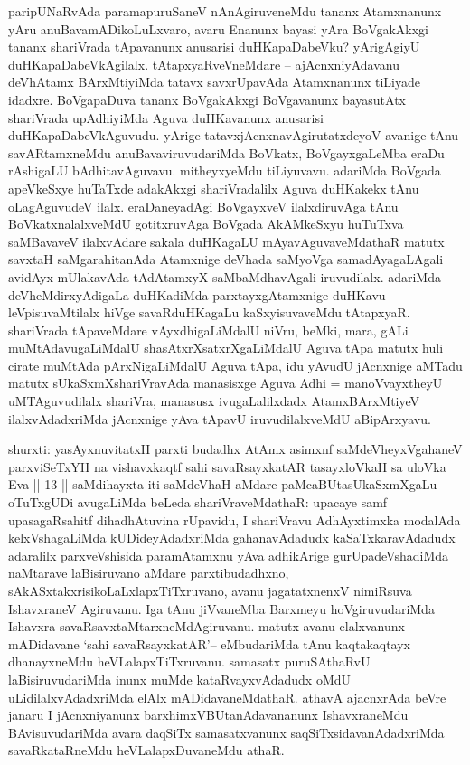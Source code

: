 \begin{artha} %
paripUNaRvAda paramapuruSaneV nAnAgiruveneMdu tananx Atamxnanunx yAru anuBavamADikoLuLxvaro, avaru Enanunx bayasi yAra BoVgakAkxgi tananx shariVrada tApavanunx anusarisi duHKapaDabeVku? yArigAgiyU duHKapaDabeVkAgilalx. tAtapxyaRveVneMdare {\rm --} ajAcnxniyAdavanu deVhAtamx BArxMtiyiMda tatavx savxrUpavAda Atamxnanunx tiLiyade idadxre. BoVgapaDuva tananx BoVgakAkxgi BoVgavanunx bayasutAtx shariVrada upAdhiyiMda Aguva duHKavanunx anusarisi duHKapaDabeVkAguvudu. yArige tatavxjAcnxnavAgirutatxdeyoV avanige tAnu savARtamxneMdu anuBavaviruvudariMda BoVkatx, BoVgayxgaLeMba eraDu rAshigaLU bAdhitavAguvavu. mitheyxyeMdu tiLiyuvavu. adariMda BoVgada apeVkeSxye huTaTxde adakAkxgi shariVradalilx Aguva duHKakekx tAnu oLagAguvudeV ilalx. eraDaneyadAgi BoVgayxveV ilalxdiruvAga tAnu BoVkatxnalalxveMdU gotitxruvAga BoVgada AkAMkeSxyu huTuTxva saMBavaveV ilalxvAdare sakala duHKagaLU mAyavAguvaveMdathaR matutx savxtaH saMgarahitanAda Atamxnige deVhada saMyoVga samadAyagaLAgali avidAyx mUlakavAda tAdAtamxyX saMbaMdhavAgali iruvudilalx. adariMda deVheMdirxyAdigaLa duHKadiMda parxtayxgAtamxnige duHKavu leVpisuvaMtilalx hiVge savaRduHKagaLu kaSxyisuvaveMdu tAtapxyaR. shariVrada tApaveMdare vAyxdhigaLiMdalU niVru, beMki, mara, gALi muMtAdavugaLiMdalU shasAtxrXsatxrXgaLiMdalU Aguva tApa matutx huli cirate muMtAda pArxNigaLiMdalU Aguva tApa, idu yAvudU jAcnxnige aMTadu matutx sUkaSxmXshariVravAda manasisxge Aguva Adhi = manoVvayxtheyU uMTAguvudilalx shariVra, manasusx ivugaLalilxdadx AtamxBArxMtiyeV ilalxvAdadxriMda jAcnxnige yAva tApavU iruvudilalxveMdU aBipArxyavu. 
\end{artha}


\vishaya{}

\begin{artha}
shurxti: yasAyxnuvitatxH parxti budadhx AtAmx asimxnf saMdeVheyxVgahaneV parxviSeTxYH na vishavxkaqtf sahi savaRsayxkatAR tasayxloVkaH sa uloVka Eva || 13 || saMdihayxta iti saMdeVhaH aMdare paMcaBUtasUkaSxmXgaLu oTuTxgUDi avugaLiMda beLeda shariVraveMdathaR: upacaye samf upasagaRsahitf dihadhAtuvina rUpavidu, I shariVravu AdhAyxtimxka modalAda kelxVshagaLiMda kUDideyAdadxriMda gahanavAdadudx kaSaTxkaravAdadudx adaralilx parxveVshisida paramAtamxnu yAva adhikArige gurUpadeVshadiMda naMtarave laBisiruvano aMdare parxtibudadhxno, sAkASxtakxrisikoLaLxlapxTiTxruvano, avanu  jagatatxnenxV nimiRsuva IshavxraneV Agiruvanu. Iga tAnu jiVvaneMba Barxmeyu hoVgiruvudariMda Ishavxra savaRsavxtaMtarxneMdAgiruvanu. matutx avanu elalxvanunx mADidavane `sahi savaRsayxkatAR'{\rm --} eMbudariMda tAnu kaqtakaqtayx dhanayxneMdu heVLalapxTiTxruvanu. samasatx puruSAthaRvU laBisiruvudariMda inunx muMde kataRvayxvAdadudx oMdU uLidilalxvAdadxriMda elAlx mADidavaneMdathaR. athavA ajacnxrAda beVre janaru I jAcnxniyanunx barxhimxVBUtanAdavananunx IshavxraneMdu BAvisuvudariMda avara daqSiTx samasatxvanunx saqSiTxsidavanAdadxriMda savaRkataRneMdu heVLalapxDuvaneMdu athaR.
\end{artha}

